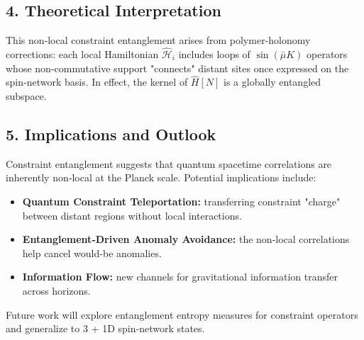 \documentclass[12pt]{article}
\begin{document}
\subsection*{4. Theoretical Interpretation}
This non‐local constraint entanglement arises from polymer‐holonomy corrections: each local Hamiltonian $\hat{\mathcal{H}}_i$ includes loops of $\sin(\bar\mu K)$ operators whose non‐commutative support "connects" distant sites once expressed on the spin‐network basis.  In effect, the kernel of $\hat{H}[N]$ is a globally entangled subspace.

\subsection*{5. Implications and Outlook}
Constraint entanglement suggests that quantum spacetime correlations are inherently non‐local at the Planck scale.  Potential implications include:
\begin{itemize}
  \item \textbf{Quantum Constraint Teleportation:} transferring constraint "charge" between distant regions without local interactions.  
  \item \textbf{Entanglement‐Driven Anomaly Avoidance:} the non‐local correlations help cancel would‐be anomalies.  
  \item \textbf{Information Flow:} new channels for gravitational information transfer across horizons.
\end{itemize}

Future work will explore entanglement entropy measures for constraint operators and generalize to 3 + 1D spin‐network states.
\end{document}
